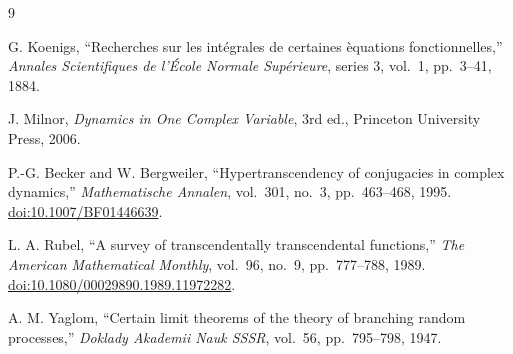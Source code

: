 \documentclass[11pt]{article}
\begin{document}
\begin{thebibliography}{9}

G. Koenigs,
``Recherches sur les int\'egrales de certaines \`equations fonctionnelles,''
\emph{Annales Scientifiques de l'\'Ecole Normale Sup\'erieure}, series 3, vol.~1, pp.~3--41, 1884.

J. Milnor,
\emph{Dynamics in One Complex Variable}, 3rd ed.,
Princeton University Press, 2006.

P.-G. Becker and W. Bergweiler,
``Hypertranscendency of conjugacies in complex dynamics,''
\emph{Mathematische Annalen}, vol.~301, no.~3, pp.~463--468, 1995.
\href{https://doi.org/10.1007/BF01446639}{doi:10.1007/BF01446639}.

L. A. Rubel,
``A survey of transcendentally transcendental functions,''
\emph{The American Mathematical Monthly}, vol.~96, no.~9, pp.~777--788, 1989.
\href{https://doi.org/10.1080/00029890.1989.11972282}{doi:10.1080/00029890.1989.11972282}.

A. M. Yaglom,
``Certain limit theorems of the theory of branching random processes,''
\emph{Doklady Akademii Nauk SSSR}, vol.~56, pp.~795--798, 1947.

\end{thebibliography}
\end{document}
